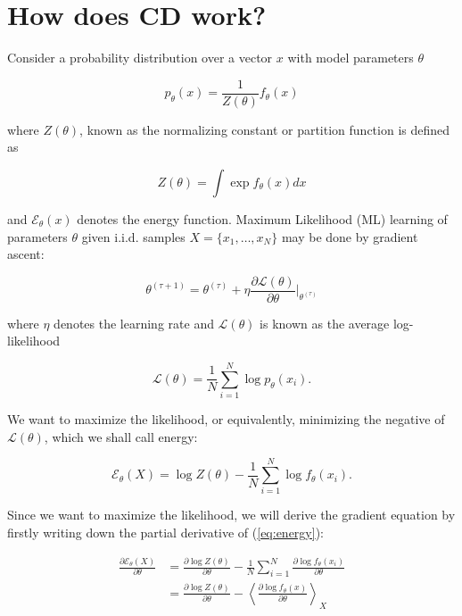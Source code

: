 \documentclass[11pt]{article}
\begin{document}
\section{How does CD work?}

Consider a probability distribution over a vector $x$ with model parameters $\theta$

\begin{equation}
p_\theta(x) = \frac{1}{Z(\theta)} f_\theta(x)
\end{equation}

where $Z(\theta)$, known as the normalizing constant or partition function is defined as

\begin{equation}
Z(\theta) = \int \exp f_\theta(x) dx
\end{equation}

and $\mathcal{E}_\theta(x)$ denotes the energy function. Maximum Likelihood (ML) learning of parameters $\theta$ given i.i.d. samples $X=\{x_1,\ldots,x_N\}$ may be done by gradient ascent:

\begin{equation}
\theta^{(\tau+1)} = \theta^{(\tau)} + \eta \frac{\partial\mathcal{L}(\theta)}{\partial \theta} \bigg\vert_{\theta^{(\tau)}}
\end{equation}

where $\eta$ denotes the learning rate and $\mathcal{L}(\theta)$ is known as the average log-likelihood

\begin{equation}
\mathcal{L}(\theta) = \frac{1}{N} \sum_{i=1}^{N} \log p_\theta(x_i).
\end{equation} 

We want to maximize the likelihood, or equivalently, minimizing the negative of $\mathcal{L}(\theta)$, which we shall call energy:

\begin{equation}
\mathcal{E}_\theta(X) = \log Z(\theta) - \frac{1}{N} \sum_{i=1}^N \log f_\theta(x_i).
\label{eq:energy}
\end{equation}

Since we want to maximize the likelihood, we will derive the gradient equation by firstly writing down the partial derivative of (\ref{eq:energy}):

\begin{align}
\frac{\partial\mathcal{E}_\theta(X)}{\partial\theta}
&= \frac{\partial\log Z(\theta)}{\partial\theta} - \frac{1}{N}\sum_{i=1}^N\frac{\partial\log f_\theta(x_i)}{\partial\theta}\\
&= \frac{\partial\log Z (\theta)}{\partial\theta} - \left\langle\frac{\partial\log f_\theta (x)}{\partial\theta}\right\rangle_X 
\label{eq:gradient}
\end{align}
\end{document}

